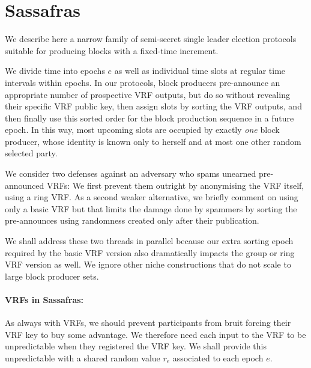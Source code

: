 
\section{Sassafras}
\label{sec:preannounced}

We describe here a narrow family of semi-secret single leader election protocols suitable for producing blocks with a fixed-time increment.  

We divide time into epochs $e$ as well as individual time slots at regular time intervals within epochs.  
In our protocols, block producers pre-announce an appropriate number of prospective VRF outputs, but do so without revealing their specific VRF public key, then assign slots by sorting the VRF outputs, and then finally use this sorted order for the block production sequence in a future epoch.
In this way, most upcoming slots are occupied by exactly \emph{one} block producer, whose identity is known only to herself and at most one other random selected party.

We consider two defenses against an adversary who spams unearned pre-announced VRFs:  We first prevent them outright by anonymising the VRF itself, using a ring VRF.  As a second weaker alternative, we briefly comment on using only a basic VRF but that limits the damage done by spammers by sorting the pre-announces using randomness created only after their publication.  

We shall address these two threads in parallel because our extra sorting epoch required by the basic VRF version also dramatically impacts the group or ring VRF version as well.  We ignore other niche constructions that do not scale to large block producer sets. 




\paragraph{VRFs in Sassafras:}
As always with VRFs, we should prevent participants from bruit forcing their VRF key to buy some advantage.  We therefore need each input to the VRF to be unpredictable when they registered the VRF key.  We shall provide this unpredictable with a shared random value $r_e$ associated to each epoch $e$.  

